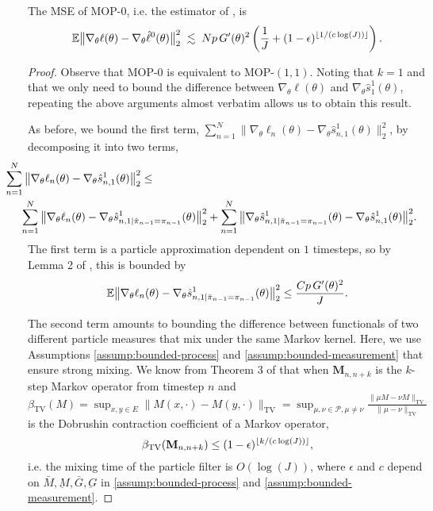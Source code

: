 \begin{cor}
    The MSE of MOP-$0$, i.e. the estimator of \cite{naesseth18}, is
    \begin{equation}
        \mathbb{E}\big\|\nabla_\theta\ell(\theta) - \nabla_\theta \hat\ell^0(\theta)\big\|_2^2 \; \lesssim 
        \; Np \, G'(\theta)^2\left(\frac{1}{J}+(1-\epsilon)^{\lfloor 1/(c\log(J)) \rfloor}\right).
    \end{equation}
\end{cor}
\begin{proof}
    Observe that MOP-$0$ is equivalent to MOP-$(1,1)$. Noting that $k=1$ and that we only need to bound the difference between $\nabla_\theta \ell(\theta)$ and $\nabla_\theta \hat s_1^1(\theta)$, repeating the above arguments almost verbatim allows us to obtain this result. 

    
As before, we bound the first term, $\sum_{n=1}^N\|\nabla_\theta\ell_n(\theta) - \nabla_\theta\hat s_{n,1}^1(\theta)\|_2^2$, by decomposing it into two terms, 
\begin{eqnarray} \nonumber
\hspace{-10mm} \sum_{n=1}^N\big\|\nabla_\theta\ell_n(\theta) - \nabla_\theta\hat s_{n,1}^1(\theta)\big\|_2^2 &\leq 
\\ &&\hspace{-45mm} 
\sum_{n=1}^N \big\|\nabla_\theta\ell_n(\theta) - \nabla_\theta\hat s_{n,1|\hat\pi_{n-1}=\pi_{n-1}}^1(\theta)\big\|_2^2 + \sum_{n=1}^N \big\|\nabla_\theta\hat s_{n,1|\hat\pi_{n-1}=\pi_{n-1}}^1(\theta) - \nabla_\theta\hat s_{n,1}^1(\theta)\big\|_2^2.
\end{eqnarray}
The first term is a particle approximation dependent on $1$ timesteps, so by Lemma 2 of \cite{karjalainen23}, this is bounded by
\begin{equation}\mathbb{E}\big\|\nabla_\theta\ell_n(\theta) - \nabla_\theta\hat s_{n,1|\hat\pi_{n-1}=\pi_{n-1}}^1(\theta)\big\|_2^2 \leq \frac{Cp \, G'(\theta)^2}{J}.\end{equation}

The second term amounts to bounding the difference between functionals of two different particle measures that mix under the same Markov kernel. Here, we use Assumptions \ref{assump:bounded-process} and \ref{assump:bounded-measurement} that ensure strong mixing. We know from Theorem 3 of \cite{karjalainen23} that when $\textbf{M}_{n,n+k}$ is the $k$-step Markov operator from timestep $n$ and $\beta_{\text{TV}}(M) = \sup _{x, y \in E}\|M(x, \cdot)-M(y, \cdot)\|_{\mathrm{TV}}=\sup _{\mu, \nu \in \mathcal{P}, \mu \neq \nu} \frac{\|\mu M-\nu M\|_{\mathrm{TV}}}{\|\mu-\nu\|_{\mathrm{TV}}}$ is the Dobrushin contraction coefficient of a Markov operator, 
\begin{equation}
\beta_{\text{TV}}(\textbf{M}_{n,n+k}) \leq (1-\epsilon)^{\lfloor k/(c\log(J)) \rfloor},
\end{equation}
i.e. the mixing time of the particle filter is $O(\log(J))$, where $\epsilon$ and $c$ depend on $\bar{M}, \underbar{M}, \bar{G}, \underbar{G}$ in \ref{assump:bounded-process} and \ref{assump:bounded-measurement}. 


\end{proof}
